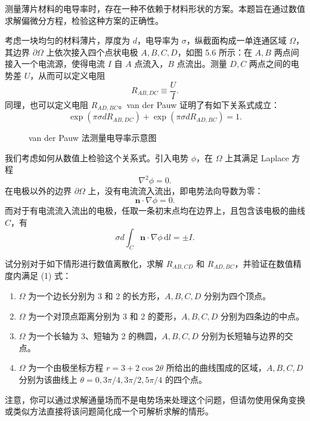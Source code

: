 测量薄片材料的电导率时，存在一种不依赖于材料形状的方案。本题旨在通过数值求解偏微分方程，检验这种方案的正确性。

考虑一块均匀的材料薄片，厚度为 $d$，电导率为 $\sigma$，纵截面构成一单连通区域 $\Omega$，其边界 $\partial\Omega$ 上依次接入四个点状电极 $A,B,C,D$，如图 5.6 所示：在 $A,B$ 两点间接入一个电流源，使得电流 $I$ 自 $A$ 点流入，$B$ 点流出。测量 $D,C$ 两点之间的电势差 $U$，从而可以定义电阻
\[
R_{AB,DC}\equiv\frac UI.
\]
同理，也可以定义电阻 $R_{AD,BC}$。van der Pauw 证明了有如下关系式成立：
\begin{equation}
\exp(\pi\sigma dR_{AB,DC})+\exp(\pi\sigma dR_{AD,BC})=1.
\tag{1}
\end{equation}

\begin{figure}[htbp]
\centering
{}
\caption{van der Pauw 法测量电导率示意图}
\label{fig:van-der-pauw}
\end{figure}

我们考虑如何从数值上检验这个关系式。引入电势 $\phi$，在 $\Omega$ 上其满足 Laplace 方程
\[
\nabla^2\phi=0.
\]
在电极以外的边界 $\partial\Omega$ 上，没有电流流入流出，即电势法向导数为零：
\[
\bm n\cdot\nabla\phi=0.
\]
而对于有电流流入流出的电极，任取一条初末点均在边界上，且包含该电极的曲线 $C$，有
\[
\sigma d\int_C\bm n\cdot\nabla\phi\,\mathrm dl=\pm I.
\]

试分别对于如下情形进行数值离散化，求解 $R_{AB,CD}$ 和 $R_{AD,BC}$，并验证在数值精度内满足 (1) 式：
\begin{enumerate}
\item $\Omega$ 为一个边长分别为 3 和 2 的长方形，$A,B,C,D$ 分别为四个顶点。
\item $\Omega$ 为一个对顶点距离分别为 3 和 2 的菱形，$A,B,C,D$ 分别为四条边的中点。
\item $\Omega$ 为一个长轴为 3、短轴为 2 的椭圆，$A,B,C,D$ 分别为长短轴与边界的交点。
\item $\Omega$ 为一个由极坐标方程 $r=3+2\cos2\theta$ 所给出的曲线围成的区域，$A,B,C,D$ 分别为该曲线上 $\theta=0,3\pi/4,3\pi/2,5\pi/4$ 的四个点。
\end{enumerate}

注意，你可以通过求解通量场而不是电势场来处理这个问题，但请勿使用保角变换或类似方法直接将该问题简化成一个可解析求解的情形。

